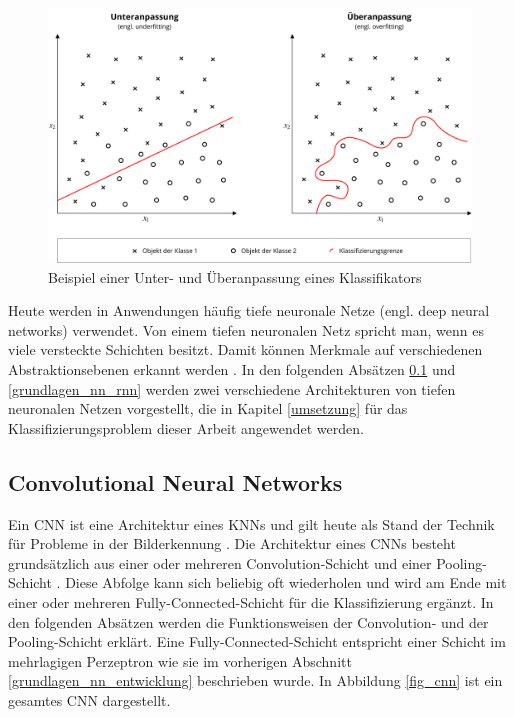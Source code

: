 \begin{figure}[h]
\centering
\includegraphics[scale=0.4]{images/overfitting.pdf}
\caption{Beispiel einer Unter- und Überanpassung eines Klassifikators}
\label{fig_overfitting}
\end{figure}

Heute werden in Anwendungen häufig tiefe neuronale Netze (engl. deep neural networks) verwendet. Von einem tiefen neuronalen Netz spricht man, wenn es viele versteckte Schichten besitzt. Damit können Merkmale auf verschiedenen Abstraktionsebenen erkannt werden \cite{lecun2015deep}. In den folgenden Absätzen \ref{grundlagen_nn_cnn} und \ref{grundlagen_nn_rnn} werden zwei verschiedene Architekturen von tiefen neuronalen Netzen vorgestellt, die in Kapitel \ref{umsetzung} für das Klassifizierungsproblem dieser Arbeit angewendet werden.


\subsection{Convolutional Neural Networks}
\label{grundlagen_nn_cnn}

Ein \acf{CNN} ist eine Architektur eines \acp{KNN} und gilt heute als Stand der Technik für Probleme in der Bilderkennung \cite{krizhevsky2012imagenet}. Die Architektur eines \acp{CNN} besteht grundsätzlich aus einer oder mehreren Convolution-Schicht und einer Pooling-Schicht \cite{lecun2010convolutional}. Diese Abfolge kann sich beliebig oft wiederholen und wird am Ende mit einer oder mehreren Fully-Connected-Schicht für die Klassifizierung ergänzt. In den folgenden Absätzen werden die Funktionsweisen der Convolution- und der Pooling-Schicht erklärt. Eine Fully-Connected-Schicht entspricht einer Schicht im mehrlagigen Perzeptron wie sie im vorherigen Abschnitt \ref{grundlagen_nn_entwicklung} beschrieben wurde. In Abbildung \ref{fig_cnn} ist ein gesamtes \ac{CNN} dargestellt.

